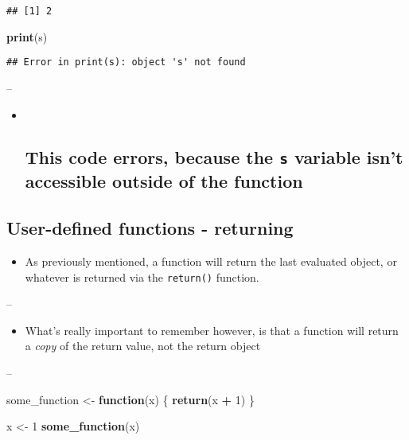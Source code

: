 \documentclass[]{article}
\newenvironment{Shaded}{\begin{snugshade}}{\end{snugshade}}
\newcommand{\ControlFlowTok}[1]{\textcolor[rgb]{0.13,0.29,0.53}{\textbf{#1}}}
\newcommand{\DecValTok}[1]{\textcolor[rgb]{0.00,0.00,0.81}{#1}}
\newcommand{\KeywordTok}[1]{\textcolor[rgb]{0.13,0.29,0.53}{\textbf{#1}}}
\newcommand{\NormalTok}[1]{#1}
\newcommand{\OperatorTok}[1]{\textcolor[rgb]{0.81,0.36,0.00}{\textbf{#1}}}
\newcommand{\StringTok}[1]{\textcolor[rgb]{0.31,0.60,0.02}{#1}}
\providecommand{\tightlist}{%
  \setlength{\itemsep}{0pt}\setlength{\parskip}{0pt}}
\begin{document}
\begin{verbatim}
## [1] 2
\end{verbatim}

\begin{Shaded}
\begin{Highlighting}[]
\KeywordTok{print}\NormalTok{(s)}
\end{Highlighting}
\end{Shaded}

\begin{verbatim}
## Error in print(s): object 's' not found
\end{verbatim}

--

\begin{itemize}
\item ~
  \hypertarget{this-code-errors-because-the-s-variable-isnt-accessible-outside-of-the-function}{%
  \subsection{\texorpdfstring{This code errors, because the \texttt{s}
  variable isn't accessible outside of the
  function}{This code errors, because the s variable isn't accessible outside of the function}}\label{this-code-errors-because-the-s-variable-isnt-accessible-outside-of-the-function}}
\end{itemize}

\hypertarget{user-defined-functions---returning}{%
\subsection{User-defined functions -
returning}\label{user-defined-functions---returning}}

\begin{itemize}
\tightlist
\item
  As previously mentioned, a function will return the last evaluated
  object, or whatever is returned via the \texttt{return()} function.
\end{itemize}

--

\begin{itemize}
\tightlist
\item
  What's really important to remember however, is that a function will
  return a \emph{copy} of the return value, not the return object
\end{itemize}

--

\begin{Shaded}
\begin{Highlighting}[]
\NormalTok{some_function <-}\StringTok{ }\ControlFlowTok{function}\NormalTok{(x) \{}
  \KeywordTok{return}\NormalTok{(x }\OperatorTok{+}\StringTok{ }\DecValTok{1}\NormalTok{)}
\NormalTok{\}}

\NormalTok{x <-}\StringTok{ }\DecValTok{1}
\KeywordTok{some_function}\NormalTok{(x)}
\end{Highlighting}
\end{Shaded}
\end{document}

